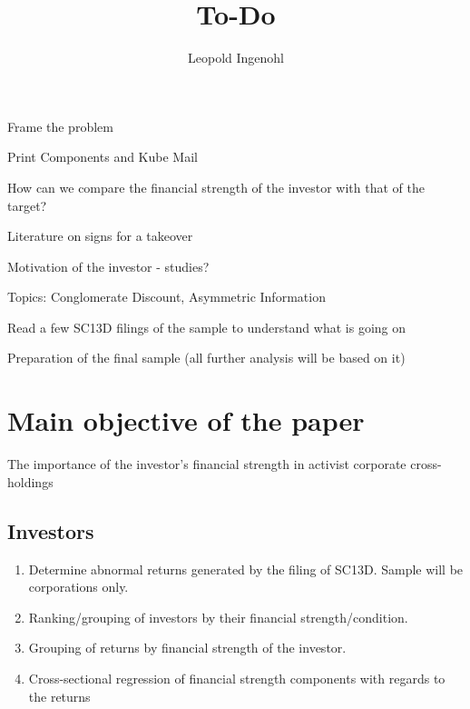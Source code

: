 \documentclass{article}
\title{To-Do}
\author{Leopold Ingenohl}
\newcommand{\cmark}{\ding{51}}%
\newcommand{\done}{\rlap{$\square$}{\raisebox{2pt}{\large\hspace{1pt}\cmark}}%
\hspace{-2.5pt}}
\begin{document}
\maketitle


  \begin{todolist}
  \item[\done] Frame the problem
  \end{todolist}

\begin{todolist}

  \item Print Components and Kube Mail 
  \item How can we compare the financial strength of the investor with that of the target?
  \item Literature on signs for a takeover
  \item Motivation of the investor - studies?
  \item Topics: Conglomerate Discount, Asymmetric Information
  \item Read a few SC13D filings of the sample to understand what is going on
  \item Preparation of the final sample (all further analysis will be based on it)


\end{todolist}

\section{Main objective of the paper}

  \begin{center}
    The importance of the investor's financial strength in activist corporate cross-holdings 
  \end{center}

  \subsection{Investors}
    
    \begin{enumerate}

      \item Determine abnormal returns generated by the filing of SC13D. Sample will be corporations only. 

      \item Ranking/grouping of investors by their financial strength/condition. 

      \item Grouping of returns by financial strength of the investor.

      \item Cross-sectional regression of financial strength components with regards to the returns
    \end{enumerate}
\end{document}
